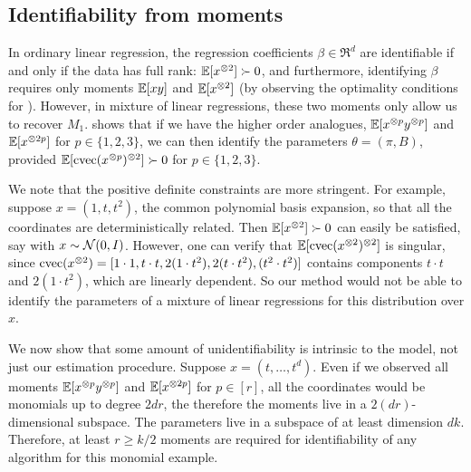 
\subsection{Identifiability from moments}

In ordinary linear regression, the regression coefficients $\beta \in \Re^d$ are
identifiable if and only if the data has full
rank: $\operatorname{\mathbb{E}}[x^{\otimes 2}] \succ 0$,
and furthermore, identifying $\beta$ requires only moments
$\operatorname{\mathbb{E}}[xy]$ and $\operatorname{\mathbb{E}}[x^{\otimes 2}]$ (by observing the optimality conditions for ).
However, in mixture of linear regressions, these two moments only allow us to recover $M_1$.
 shows that if we have the higher order analogues,
$\operatorname{\mathbb{E}}[x^{\otimes p}y^{\otimes p}]$ and $\operatorname{\mathbb{E}}[x^{\otimes 2p}]$ for $p \in \{1,2,3\}$,
we can then identify the parameters $\theta = (\pi, B)$,
provided $\operatorname{\mathbb{E}}[\operatorname{cvec}(x^{\otimes p})^{\otimes 2}] \succ 0$ for $p \in \{1,2,3\}$.

We note that the positive definite constraints are more stringent.
For example, suppose $x = (1, t, t^2)$,
the common polynomial basis expansion, so that all the coordinates are deterministically related.
Then $\operatorname{\mathbb{E}}[x^{\otimes 2}] \succ 0$ can easily be satisfied, say with $x \sim \mathcal{N}(0, I)$.
However, one can verify that $\operatorname{\mathbb{E}}[\operatorname{cvec}(x^{\otimes 2})^{\otimes 2}]$ is singular,
since $\operatorname{cvec}(x^{\otimes 2}) = [1 \cdot 1, t\cdot t, 2(1 \cdot t^2), 2(t \cdot t^2), (t^2 \cdot t^2)]$ contains
components $t \cdot t$ and $2(1 \cdot t^2)$, which are linearly dependent.
So our method would not be able to identify the parameters of a mixture of
linear regressions for this distribution over $x$.

We now show that some amount of unidentifiability is intrinsic to the model,
not just our estimation procedure.
Suppose $x = (t, \dots, t^d)$.
Even if we observed all moments
$\operatorname{\mathbb{E}}[x^{\otimes p}y^{\otimes p}]$ and $\operatorname{\mathbb{E}}[x^{\otimes 2p}]$ for $p \in [r]$,
all the coordinates would be monomials up to degree $2dr$,
the therefore the moments live in a $2(dr)$-dimensional subspace.
The parameters live in a subspace of at least dimension $dk$.
Therefore, at least $r \ge k/2$ moments are required for identifiability of any
algorithm for this monomial example.



